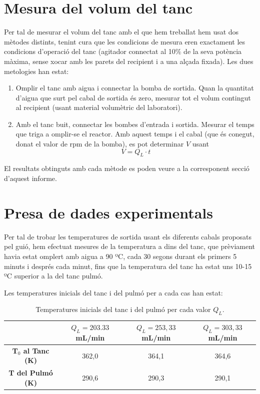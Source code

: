 \documentclass[10pt, twoside]{article}
\begin{document}
\section{Mesura del volum del tanc}
Per tal de mesurar el volum del tanc amb el que hem treballat hem usat dos mètodes distints, tenint cura que les condicions de mesura eren exactament les condicions d'operació del tanc (agitador connectat al 10$\%$ de la seva potència màxima, sense xocar amb les parets del recipient i a una alçada fixada). Les dues metologies han estat:
\begin{enumerate}
    \item Omplir el tanc amb aigua i connectar la bomba de sortida. Quan la quantitat d'aigua que surt pel cabal de sortida és zero, mesurar tot el volum contingut al recipient (usant material volumètric del laboratori).
    \item Amb el tanc buit, connectar les bombes d'entrada i sortida. Mesurar el temps que triga a omplir-se el reactor. Amb aquest temps i el cabal (que és conegut, donat el valor de rpm de la bomba), es pot determinar $V$ usant
    \begin{equation}
        V = Q_L \cdot t
    \end{equation}
\end{enumerate}
El resultats obtinguts amb cada mètode es poden veure a la corresponent secció d'aquest informe.

\section{Presa de dades experimentals}
Per tal de trobar les temperatures de sortida usant els diferents cabals proposats pel guió, hem efectuat mesures de la temperatura a dins del tanc, que prèviament havia estat omplert amb aigua a 90 ºC, cada 30 segons durant els primers 5 minuts i després cada minut, fins que la temperatura del tanc ha estat uns 10-15 ºC superior a la del tanc pulmó.

Les temperatures inicials del tanc i del pulmó per a cada cas han estat:

\begin{table}[h!]
    \centering
    \caption{Temperatures inicials del tanc i del pulmó per cada valor $Q_L$.}
    \begin{tabular}{cccc}
        \toprule
        & $Q_L = 203.33$ mL/min & $Q_L = 253,33$ mL/min & $Q_L = 303,33$ mL/min \\
        \midrule
        \textbf{T$_0$ al Tanc (K)} & 362,0 & 364,1 & 364,6 \\
        \textbf{T del Pulmó (K)}  & 290,6 & 290,3 & 290,1 \\
        \bottomrule
    \end{tabular}
    \label{tabla:temperaturas}
\end{table}
\end{document}

